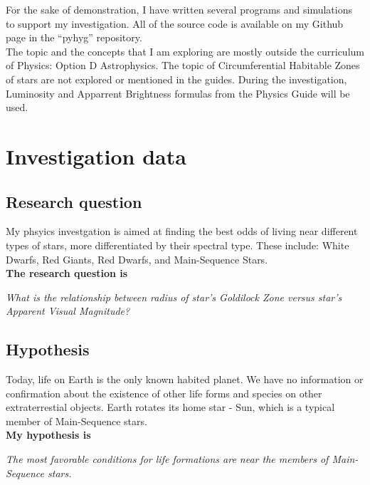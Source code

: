 \documentclass{article}
\begin{document}
For the sake of demonstration, I have written several programs and simulations to support my investigation. All of the source code is available on my Github page in the ``pyhyg'' repository. \cite{github}\\

  The topic and the concepts that I am exploring are mostly outside the curriculum of Physics: Option D Astrophysics. The topic of Circumferential Habitable Zones of stars are not explored or mentioned in the guides. During the investigation, Luminosity and Apparrent Brightness formulas from the Physics Guide will be used. 

\section{Investigation data}

\subsection{Research question}

My phsyics investgation is aimed at finding the best odds of living near different types of stars, more differentiated by their spectral type. These include: White Dwarfs, Red Giants, Red Dwarfs, and Main-Sequence Stars.\\

\textbf{The research question is}


 \textit{What is the relationship between radius of star's Goldilock Zone versus star's Apparent Visual Magnitude?}

\subsection{Hypothesis}

Today, life on Earth is the only known habited planet. We have no information or confirmation about the existence of other life forms and species on other extraterrestial objects. Earth rotates its home star - Sun, which is a typical member of Main-Sequence stars.\\

\textbf{My hypothesis is}

  \textit{The most favorable conditions for life formations are near the members of Main-Sequence stars.}
  
\end{document}
